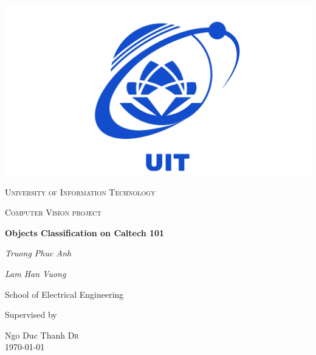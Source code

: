 \begin{titlepage}


\thispagestyle{empty}
\setlength\headheight{0pt} 
\begin{center}

\begin{center}
\includegraphics[width=0.5\linewidth]{images/logo.jpg}            
\end{center}	

        \vspace{0.25cm}
        {\scshape\LARGE University of Information Technology \par}
        \vspace{0.25cm}
        {\scshape\Large Computer Vision project\par}
        \vspace{0.5cm}

        {\Large\bfseries Objects Classification on Caltech 101\par}
        
        \vspace{0.5cm}
        {\Large\itshape Truong Phuc Anh\par}
        {\Large\itshape Lam Han Vuong\par}
        School of Electrical Engineering
        \vspace{0.25cm}

\vspace{1cm}
Supervised by\par
Ngo Duc Thanh \textsc{Dr} \\
\vspace{1.5cm}
\large
\today

\end{center}

\clearpage
\restoregeometry
\end{titlepage}
